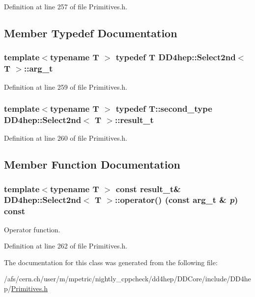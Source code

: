 Definition at line 257 of file Primitives.h.

\subsection{Member Typedef Documentation}
\hypertarget{class_d_d4hep_1_1_select2nd_a1159f763d3e02055e64e1c757c0e05c0}{
\subsubsection[{arg\_\-t}]{\setlength{\rightskip}{0pt plus 5cm}template$<$typename T $>$ typedef {\bf T} {\bf DD4hep::Select2nd}$<$ {\bf T} $>$::{\bf arg\_\-t}}}
\label{class_d_d4hep_1_1_select2nd_a1159f763d3e02055e64e1c757c0e05c0}


Definition at line 259 of file Primitives.h.\hypertarget{class_d_d4hep_1_1_select2nd_acfbf4d9607a113083ddcfa3b16385c2e}{
\subsubsection[{result\_\-t}]{\setlength{\rightskip}{0pt plus 5cm}template$<$typename T $>$ typedef T::second\_\-type {\bf DD4hep::Select2nd}$<$ {\bf T} $>$::{\bf result\_\-t}}}
\label{class_d_d4hep_1_1_select2nd_acfbf4d9607a113083ddcfa3b16385c2e}


Definition at line 260 of file Primitives.h.

\subsection{Member Function Documentation}
\hypertarget{class_d_d4hep_1_1_select2nd_af28d9c81d9a43a766f4b31f754601f21}{
\subsubsection[{operator()}]{\setlength{\rightskip}{0pt plus 5cm}template$<$typename T $>$ const {\bf result\_\-t}\& {\bf DD4hep::Select2nd}$<$ {\bf T} $>$::operator() (const {\bf arg\_\-t} \& {\em p}) const}}
\label{class_d_d4hep_1_1_select2nd_af28d9c81d9a43a766f4b31f754601f21}


Operator function. 

Definition at line 262 of file Primitives.h.

The documentation for this class was generated from the following file:\begin{DoxyCompactItemize}
\item 
/afs/cern.ch/user/m/mpetric/nightly\_\-cppcheck/dd4hep/DDCore/include/DD4hep/\hyperlink{_primitives_8h}{Primitives.h}\end{DoxyCompactItemize}
